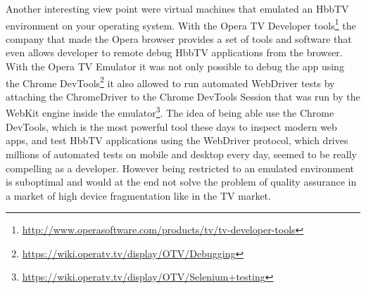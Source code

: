 Another interesting view point were virtual machines that emulated an HbbTV environment on your operating system.
With the Opera TV Developer tools\footnote{\url{http://www.operasoftware.com/products/tv/tv-developer-tools}} the
company that made the Opera browser provides a set of tools and software that even allows developer to remote debug
HbbTV applications from the browser. With the Opera TV Emulator it was not only possible to debug the app using
the Chrome DevTools\footnote{\url{https://wiki.operatv.tv/display/OTV/Debugging}} it also allowed to run automated
WebDriver tests by attaching the ChromeDriver to the Chrome DevTools Session that was run by the WebKit engine inside
the emulator\footnote{\url{https://wiki.operatv.tv/display/OTV/Selenium+testing}}. The idea of being able use the
Chrome DevTools, which is the most powerful tool these days to inspect modern web apps, and test HbbTV applications
using the WebDriver protocol, which drives millions of automated tests on mobile and desktop every day, seemed to be
really compelling as a developer. However being restricted to an emulated environment is suboptimal and would at the
end not solve the problem of quality assurance in a market of high device fragmentation like in the TV market.

